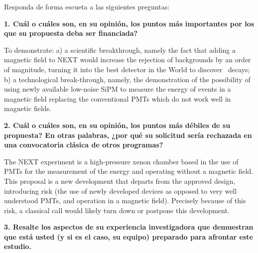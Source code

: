 \vspace{6pt}

Responda de forma escueta a las siguientes preguntas:

\vspace{6pt}

\noindent\textbf{1. Cuál o cuáles son, en su opinión, los puntos más importantes por los que su propuesta deba ser financiada?}

\noindent {\color{blue}{Máximo 500 caracteres}}
\vspace{6pt}

\noindent To demonstrate: a) a scientific breakthrough, namely the fact that adding a magnetic field to NEXT would increase the rejection of backgrounds by an order of magnitude, turning it into the best detector in the World to discover \bbonu\ decays; b) a technological break-through, namely, the demonstration of the possibility of using newly available low-noise SiPM to measure the energy of events in a magnetic field replacing the conventional PMTs which do not work well in magnetic fields.   

\vspace{6pt}

\noindent\textbf{2. Cuál o cuáles son, en su opinión, los puntos más débiles de su propuesta? En otras palabras, ¿por qué su solicitud sería rechazada en una convocatoria clásica de otros programas?}

\noindent{\color{blue}{Máximo 500 caracteres}}

\vspace{6pt}

\noindent The NEXT experiment is a high-pressure xenon chamber based in the use of PMTs for the measurement of the energy and operating without a magnetic field. This proposal is a new development that departs from the approved design, introducing risk (the use of newly developed devices as opposed to very well understood PMTs, and operation in a magnetic field). Precisely because of this risk, a classical call would likely turn down or postpone this development. 

\vspace{6pt}

\noindent\textbf{3. Resalte los aspectos de su experiencia investigadora que demuestran que está usted (y si es el caso, su equipo) preparado para afrontar este estudio.}

\noindent {\color{blue}{Máximo 500 caracteres}}

\vspace{6pt}

